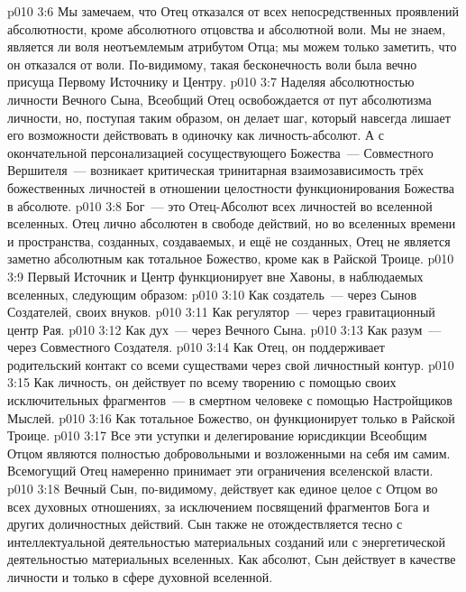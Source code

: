 \vs p010 3:6 Мы замечаем, что Отец отказался от всех непосредственных проявлений абсолютности, кроме абсолютного отцовства и абсолютной воли. Мы не знаем, является ли воля неотъемлемым атрибутом Отца; мы можем только заметить, что он  отказался от воли. По\hyp{}видимому, такая бесконечность воли была вечно присуща Первому Источнику и Центру.
\vs p010 3:7 Наделяя абсолютностью личности Вечного Сына, Всеобщий Отец освобождается от пут абсолютизма личности, но, поступая таким образом, он делает шаг, который навсегда лишает его возможности действовать в одиночку как личность\hyp{}абсолют. А с окончательной персонализацией сосуществующего Божества~--- Совместного Вершителя~--- возникает критическая тринитарная взаимозависимость трёх божественных личностей в отношении целостности функционирования Божества в абсолюте.
\vs p010 3:8 Бог~--- это Отец\hyp{}Абсолют всех личностей во вселенной вселенных. Отец лично абсолютен в свободе действий, но во вселенных времени и пространства, созданных, создаваемых, и ещё не созданных, Отец не является заметно абсолютным как тотальное Божество, кроме как в Райской Троице.
\vs p010 3:9 \pc Первый Источник и Центр функционирует вне Хавоны, в наблюдаемых вселенных, следующим образом:
\vs p010 3:10 Как создатель~--- через Сынов Создателей, своих внуков.
\vs p010 3:11 Как регулятор~--- через гравитационный центр Рая.
\vs p010 3:12 Как дух~--- через Вечного Сына.
\vs p010 3:13 Как разум~--- через Совместного Создателя.
\vs p010 3:14 Как Отец, он поддерживает родительский контакт со всеми существами через свой личностный контур.
\vs p010 3:15 Как личность, он действует  по всему творению с помощью своих исключительных фрагментов~--- в смертном человеке с помощью Настройщиков Мыслей.
\vs p010 3:16 Как тотальное Божество, он функционирует только в Райской Троице.
\vs p010 3:17 \pc Все эти уступки и делегирование юрисдикции Всеобщим Отцом являются полностью добровольными и возложенными на себя им самим. Всемогущий Отец намеренно принимает эти ограничения вселенской власти.
\vs p010 3:18 \pc Вечный Сын, по\hyp{}видимому, действует как единое целое с Отцом во всех духовных отношениях, за исключением посвящений фрагментов Бога и других доличностных действий. Сын также не отождествляется тесно с интеллектуальной деятельностью материальных созданий или с энергетической деятельностью материальных вселенных. Как абсолют, Сын действует в качестве личности и только в сфере духовной вселенной.

